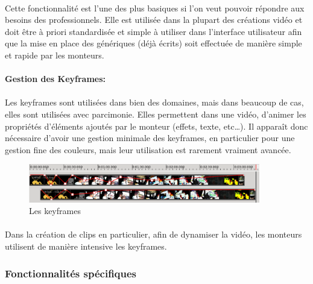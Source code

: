 \paragraph{}
Cette fonctionnalité est l'une des plus basiques si
l'on veut pouvoir répondre aux besoins des professionnels. Elle est utilisée
dans la plupart des créations vidéo et doit être à priori standardisée et
simple à utiliser dans l'interface utilisateur afin que la mise en place
des génériques (déjà écrits) soit effectuée de manière simple et rapide
par les monteurs.

\paragraph{Gestion des Keyframes:}
\paragraph{}
Les keyframes sont utilisées dans bien des domaines, mais dans beaucoup de cas, elles sont
utilisées avec parcimonie. Elles permettent dans une vidéo, d'animer les propriétés
d'éléments ajoutés par le monteur (effets, texte, etc\ldots). Il
apparaît donc nécessaire d'avoir une gestion minimale des keyframes,
en particulier pour une gestion fine des couleurs, mais leur utilisation est
rarement vraiment avancée.

\begin{figure}
  \begin{center}
    \includegraphics[width=0.9\textwidth]{images/keyframecurves}
  \end{center} \caption{Les keyframes} \label{Yes}
\end{figure}

\paragraph{}
Dans la création de clips en particulier, afin de dynamiser la vidéo,
les monteurs utilisent de manière intensive les keyframes.

\subsubsection{Fonctionnalités spécifiques}

